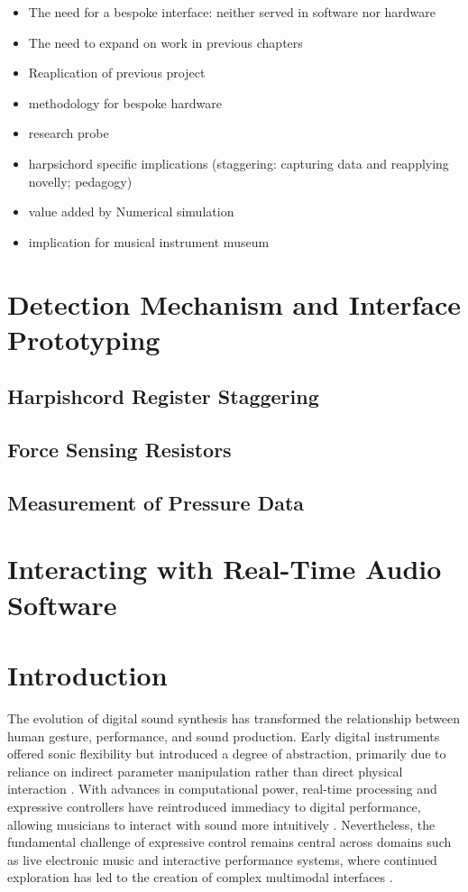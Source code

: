 
\begin{itemize}
    \item The need for a bespoke interface: neither served in software nor hardware
    \item The need to expand on work in previous chapters
    \item Reaplication of previous project
    \item methodology for bespoke hardware
    \item research probe    
    \item harpsichord specific implications (staggering: capturing data and reapplying novelly; pedagogy)
    \item value added by Numerical simulation
    \item implication for musical instrument museum
\end{itemize}

\section{Detection Mechanism and Interface Prototyping}
\subsection{Harpishcord Register Staggering}
\subsection{Force Sensing Resistors}
\subsection{Measurement of Pressure Data}
\section{Interacting with Real-Time Audio Software}


\section{Introduction} 
\label{sec:introduction}
The evolution of digital sound synthesis has transformed the relationship between human gesture, performance, and sound production. Early digital instruments offered sonic flexibility but introduced a degree of abstraction, primarily due to reliance on indirect parameter manipulation rather than direct physical interaction \cite{roads_computer_1996, moore_elements_1990}. With advances in computational power, real-time processing and expressive controllers have reintroduced immediacy to digital performance, allowing musicians to interact with sound more intuitively \cite{trolland_airsticks_2022,caren_keywi_2020,mcpherson_space_2013}. Nevertheless, the fundamental challenge of expressive control remains central across domains such as live electronic music and interactive performance systems, where continued exploration has led to the creation of complex multimodal interfaces \cite{tanaka_multimodal_2002}.

